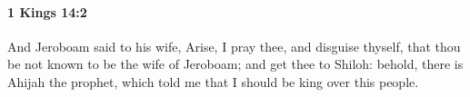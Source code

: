 
		\paragraph{1 Kings 14:2} %
			\label{1KINGS-14-2}

			And Jeroboam said to his wife, Arise, I pray thee, and disguise thyself, that thou be not known to be the wife of Jeroboam; and get thee to Shiloh: behold, there is Ahijah the prophet, which told me that I should be king over this people.


